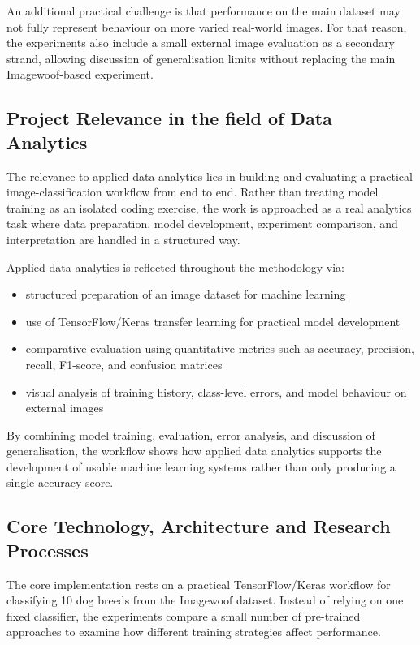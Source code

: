 \documentclass[12pt, a4paper]{article}
\begin{document}
An additional practical challenge is that performance on the main dataset may not fully represent behaviour on more varied real-world images. For that reason, the experiments also include a small external image evaluation as a secondary strand, allowing discussion of generalisation limits without replacing the main Imagewoof-based experiment.

\subsection{Project Relevance in the field of Data Analytics}

The relevance to applied data analytics lies in building and evaluating a practical image-classification workflow from end to end. Rather than treating model training as an isolated coding exercise, the work is approached as a real analytics task where data preparation, model development, experiment comparison, and interpretation are handled in a structured way.

Applied data analytics is reflected throughout the methodology via:

\begin{itemize}
  \item structured preparation of an image dataset for machine learning
  \item use of TensorFlow/Keras transfer learning for practical model development
  \item comparative evaluation using quantitative metrics such as accuracy, precision, recall, F1-score, and confusion matrices
  \item visual analysis of training history, class-level errors, and model behaviour on external images
\end{itemize}

By combining model training, evaluation, error analysis, and discussion of generalisation, the workflow shows how applied data analytics supports the development of usable machine learning systems rather than only producing a single accuracy score.

\subsection{Core Technology, Architecture and Research Processes}

The core implementation rests on a practical TensorFlow/Keras workflow for classifying 10 dog breeds from the Imagewoof dataset. Instead of relying on one fixed classifier, the experiments compare a small number of pre-trained approaches to examine how different training strategies affect performance.
\end{document}
